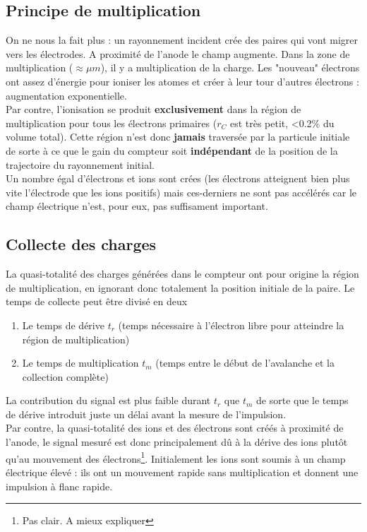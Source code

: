 \subsection{Principe de multiplication}%
On ne nous la fait plus : un rayonnement incident crée des paires qui vont migrer vers les
électrodes. A proximité de l'anode le champ augmente. Dans la zone de multiplication 
($\approx \mu m$), il y a multiplication de la charge. Les "nouveau" électrons ont assez 
d'énergie pour ioniser les atomes et créer à leur tour d'autres électrons : augmentation
exponentielle.\\

Par contre, l'ionisation se produit \textbf{exclusivement} dans la région de multiplication pour
tous les électrons primaires ($r_C$ est très petit, <0.2\% du volume total). Cette région n'est
donc \textbf{jamais} traversée par la particule initiale de sorte à ce que le gain du compteur
soit \textbf{indépendant} de la position de la trajectoire du rayonnement initial.\\

Un nombre égal d'électrons et ions sont crées (les électrons atteignent bien plus vite l'électrode
que les ions positifs) mais ces-derniers ne sont pas accélérés car le champ électrique n'est, pour 
eux, pas suffisament important.

\subsection{Collecte des charges}%
La quasi-totalité des charges générées dans le compteur ont pour origine la région de multiplication, 
en ignorant donc totalement la position initiale de la paire. Le temps de collecte peut être divisé
en deux
\begin{enumerate}
\item Le temps de dérive $t_r$ (temps nécessaire à l'électron libre pour atteindre la région de
multiplication)
\item Le temps de multiplication $t_m$ (temps entre le début de l'avalanche et la collection 
complète)
\end{enumerate}
La contribution du signal est plus faible durant $t_r$ que $t_m$ de sorte que le temps de dérive
introduit juste un délai avant la mesure de l'impulsion. \\

Par contre, la quasi-totalité des ions et des électrons sont créés à proximité de l'anode, 
le signal mesuré est donc principalement dû à la dérive des ions plutôt qu'au mouvement des 
électrons\footnote{Pas clair. A mieux expliquer}. Initialement les ions sont soumis à un champ
électrique élevé : ils ont un mouvement rapide sans multiplication et donnent une impulsion à flanc rapide.



